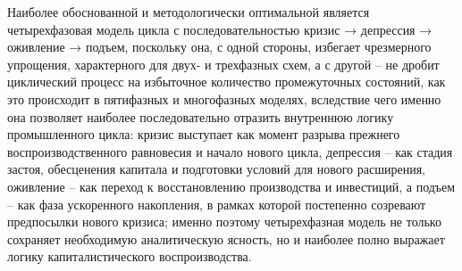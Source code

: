 Наиболее обоснованной и методологически оптимальной является четырехфазовая модель цикла с последовательностью кризис → депрессия → оживление → подъем, поскольку она, с одной стороны, избегает чрезмерного упрощения, характерного для двух- и трехфазных схем, а с другой – не дробит циклический процесс на избыточное количество промежуточных состояний, как это происходит в пятифазных и многофазных моделях, вследствие чего именно она позволяет наиболее последовательно отразить внутреннюю логику промышленного цикла: кризис выступает как момент разрыва прежнего воспроизводственного равновесия и начало нового цикла, депрессия – как стадия застоя, обесценения капитала и подготовки условий для нового расширения, оживление – как переход к восстановлению производства и инвестиций, а подъем – как фаза ускоренного накопления, в рамках которой постепенно созревают предпосылки нового кризиса; именно поэтому четырехфазная модель не только сохраняет необходимую аналитическую ясность, но и наиболее полно выражает логику капиталистического воспроизводства.